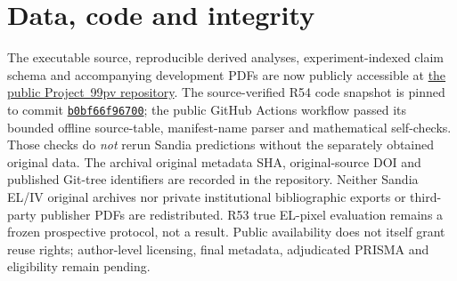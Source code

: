 \documentclass[10pt,a4paper]{article}
\begin{document}
\section*{Data, code and integrity}
The executable source, reproducible derived analyses, experiment-indexed claim schema and accompanying development PDFs are now publicly accessible at \href{https://github.com/shaikhamalkawi-ux/pv-imaging-validation-audit}{the public Project~99pv repository}. The source-verified R54 code snapshot is pinned to commit \href{https://github.com/shaikhamalkawi-ux/pv-imaging-validation-audit/commit/b0bf66f9670000297986569dab6de85d55bec822}{\texttt{b0bf66f96700}}; the public GitHub Actions workflow passed its bounded offline source-table, manifest-name parser and mathematical self-checks. Those checks do \emph{not} rerun Sandia predictions without the separately obtained original data. The archival original metadata SHA, original-source DOI and published Git-tree identifiers are recorded in the repository. Neither Sandia EL/IV original archives nor private institutional bibliographic exports or third-party publisher PDFs are redistributed. R53 true EL-pixel evaluation remains a frozen prospective protocol, not a result. Public availability does not itself grant reuse rights; author-level licensing, final metadata, adjudicated PRISMA and eligibility remain pending. \cite{wilkinson2016}
\end{document}
